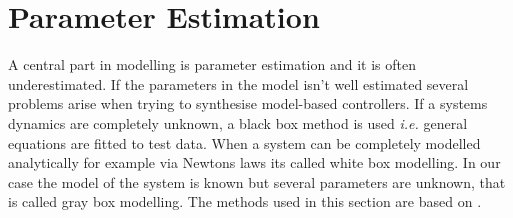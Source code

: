 \chapter{Parameter Estimation} \label{cha:parameterEstimation}
A central part in modelling is parameter estimation and it is often underestimated. If the parameters in the model isn't well estimated several problems arise when trying to synthesise model-based controllers. If a systems dynamics are completely unknown, a black box method is used \textit{i.e.} general equations are fitted to test data. When a system can be completely modelled analytically for example via Newtons laws its called white box modelling. In our case the model of the system is known but several parameters are unknown, that is called gray box modelling. The methods used in this section are based on \citet{modellbygge}.


